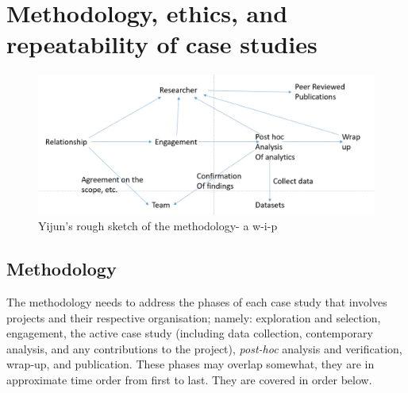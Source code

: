 \section{Methodology, ethics, and repeatability of case studies} \label{section-methodology-ethics-and-repeatability-of-case-studies}

\begin{figure}
    \centering
    \includegraphics[width=14cm]{images/rough-sketches/Yijun-rough-sketch-of-relationships-in-case-study-methodology.png}
    \caption{Yijun's rough sketch of the methodology- a w-i-p}
    \label{fig:yijun-methodology-sketch}
\end{figure}

\subsection{Methodology}
The methodology needs to address the phases of each case study that involves projects and their respective organisation; namely: exploration and selection, engagement, the active case study (including data collection, contemporary analysis, and any contributions to the project), \emph{post-hoc} analysis and verification, wrap-up, and publication. These phases may overlap somewhat, they are in approximate time order from first to last. They are covered in order below.

